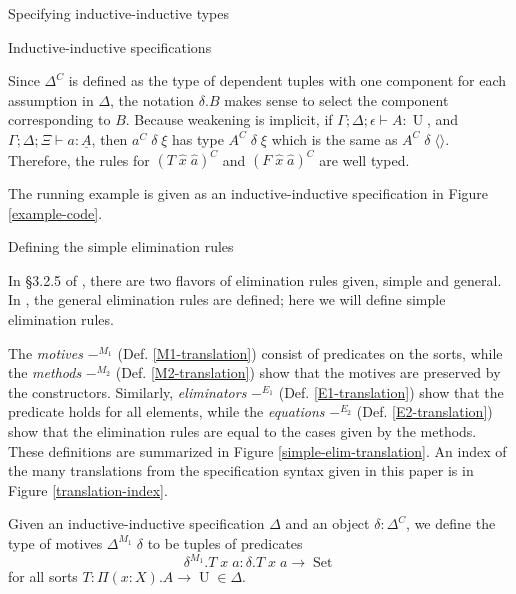 \documentclass[acmsmall,review]{acmart}\settopmatter{printfolios=true,printccs=false,printacmref=false}
\DeclareMathOperator{\USet}{Set}
\DeclareMathOperator{\UU}{U}
\newcommand{\tac}{\vdash}
\def\emptytuple{\langle\rangle}
\begin{document}
\begin{section}{Specifying inductive-inductive types}
\begin{subsection}{Inductive-inductive specifications}
\begin{definition}
Since $\Delta^C$ is defined as the type of dependent tuples with one component for each assumption in $\Delta$, the notation $\delta.B$ makes sense to select the component corresponding to $B$.
Because weakening is implicit, if $\Gamma ; \Delta ; \epsilon \tac A : \UU$, and $\Gamma ; \Delta ; \Xi \tac a : \underline{A}$, then $a^C\;\delta\;\xi$ has type $A^C\;\delta\;\xi$ which is the same as $A^C\;\delta\;\emptytuple$. Therefore, the rules for $(T\;\hat{x}\;\hat{a})^C$ and $(F\;\hat{x}\;\hat{a})^C$ are well typed. %

The running example is given as an inductive-inductive specification in Figure \ref{example-code}.

\end{definition}

\end{subsection}
\begin{subsection}{\label{simple-elim-section}Defining the simple elimination rules}
    
In \S3.2.5 of \citet{nordvallforsberg2013thesis}, there are two flavors of elimination rules given, simple and general. In \citet{KaposiKovacsHIITsyntax}, the general elimination rules are defined; here we will define simple elimination rules.

The \emph{motives} $-^{M_1}$ (Def. \ref{M1-translation}) consist of predicates on the sorts, while the \emph{methods} $-^{M_2}$ (Def. \ref{M2-translation}) show that the motives are preserved by the constructors. Similarly, \emph{eliminators} $-^{E_1}$ (Def. \ref{E1-translation}) show that the predicate holds for all elements, while the \emph{equations} $-^{E_2}$ (Def. \ref{E2-translation}) show that the elimination rules are equal to the cases given by the methods. These definitions are summarized in Figure \ref{simple-elim-translation}. An index of the many translations from the specification syntax given in this paper is in Figure \ref{translation-index}.

\begin{definition}
Given an inductive-inductive specification $\Delta$ and an object $\delta : \Delta^C$, we define the type of motives $\Delta^{M_1}\;\delta$ to be tuples of predicates \[\delta^{M_1}.T\;x\;a : \delta.T\;x\;a \to \USet\] for all sorts $T : \Pi(x : X).A \to \UU \in \Delta$.
\end{definition}


\end{subsection}
\end{section}
\end{document}
